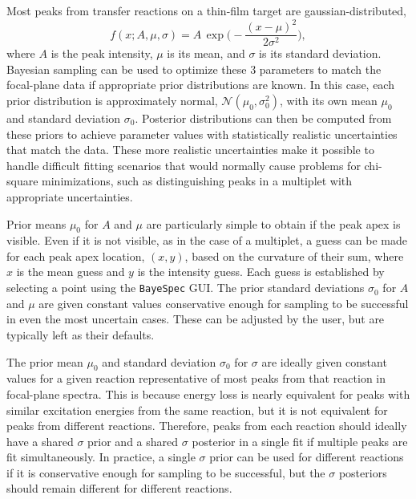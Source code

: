 Most peaks from transfer reactions on a thin-film target are gaussian-distributed,
\begin{equation}
    f(x;A,\mu,\sigma) = A \, \exp \Big( -\frac{(x-\mu)^{2}}{2\sigma^{2}} \Big),
\end{equation}
where $A$ is the peak intensity, $\mu$ is its mean, and $\sigma$ is its standard deviation.
Bayesian sampling can be used to optimize these 3 parameters to match the focal-plane data if appropriate prior distributions are known. In this case, each prior distribution is approximately normal, $\mathcal{N}(\mu_{0},\sigma_{0}^{2})$, with its own mean $\mu_{0}$ and standard deviation $\sigma_{0}$. Posterior distributions can then be computed from these priors to achieve parameter values with statistically realistic uncertainties that match the data. These more realistic uncertainties make it possible to handle difficult fitting scenarios that would normally cause problems for chi-square minimizations, such as distinguishing peaks in a multiplet with appropriate uncertainties.

Prior means $\mu_{0}$ for $A$ and $\mu$ are particularly simple to obtain if the peak apex is visible. Even if it is not visible, as in the case of a multiplet, a guess can be made for each peak apex location, $(x,y)$, based on the curvature of their sum, where $x$ is the mean guess and $y$ is the intensity guess. Each guess is established by selecting a point using the \texttt{BayeSpec} GUI. The prior standard deviations $\sigma_{0}$ for $A$ and $\mu$ are given constant values conservative enough for sampling to be successful in even the most uncertain cases. These can be adjusted by the user, but are typically left as their defaults.

The prior mean $\mu_{0}$ and standard deviation $\sigma_{0}$ for $\sigma$ are ideally given constant values for a given reaction representative of most peaks from that reaction in focal-plane spectra. This is because energy loss is nearly equivalent for peaks with similar excitation energies from the same reaction, but it is not equivalent for peaks from different reactions. Therefore, peaks from each reaction should ideally have a shared $\sigma$ prior and a shared $\sigma$ posterior in a single fit if multiple peaks are fit simultaneously. In practice, a single $\sigma$ prior can be used for different reactions if it is conservative enough for sampling to be successful, but the $\sigma$ posteriors should remain different for different reactions. 

